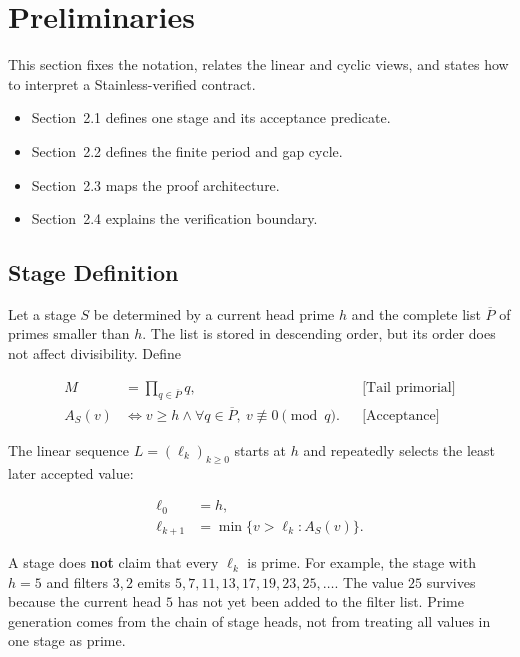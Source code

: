 \section{Preliminaries}
\label{sec:preliminaries}

This section fixes the notation, relates the linear and cyclic views, and
states how to interpret a Stainless-verified contract.

\begin{itemize}
  \item Section~2.1 defines one stage and its acceptance predicate.
  \item Section~2.2 defines the finite period and gap cycle.
  \item Section~2.3 maps the proof architecture.
  \item Section~2.4 explains the verification boundary.
\end{itemize}

\subsection{Stage Definition}
\label{sec:stage-definition}

Let a stage $S$ be determined by a current head prime $h$ and the
complete list $\overline{P}$ of primes smaller than $h$. The list is
stored in descending order, but its order does not affect divisibility.
Define

\begin{equation*}
\begin{aligned}
M &= \prod_{q \in \overline{P}} q,
  &&\text{[Tail primorial]} \\
A_S(v) &\Longleftrightarrow
  v \ge h \land
  \forall q \in \overline{P},\ v \not\equiv 0 \pmod q.
  &&\text{[Acceptance]}
\end{aligned}
\end{equation*}

The linear sequence $L=(\ell_k)_{k\ge 0}$ starts at $h$ and repeatedly
selects the least later accepted value:

\begin{equation*}
\begin{aligned}
\ell_0 &= h, \\
\ell_{k+1}
  &= \min\{v\gt\ell_k : A_S(v)\}.
\end{aligned}
\end{equation*}

A stage does \textbf{not} claim that every $\ell_k$ is prime. For
example, the stage with $h=5$ and filters $3,2$ emits
$5,7,11,13,17,19,23,25,\ldots$. The value $25$ survives because the
current head $5$ has not yet been added to the filter list. Prime
generation comes from the chain of stage heads, not from treating all
values in one stage as prime.

